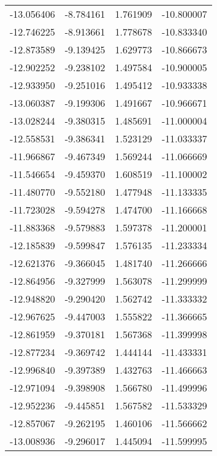 \begin{tabular}{rrrr}
      -13.056406 &        -8.784161 &    1.761909 & -10.800007 \\
      -12.746225 &        -8.913661 &    1.778678 & -10.833340 \\
      -12.873589 &        -9.139425 &    1.629773 & -10.866673 \\
      -12.902252 &        -9.238102 &    1.497584 & -10.900005 \\
      -12.933950 &        -9.251016 &    1.495412 & -10.933338 \\
      -13.060387 &        -9.199306 &    1.491667 & -10.966671 \\
      -13.028244 &        -9.380315 &    1.485691 & -11.000004 \\
      -12.558531 &        -9.386341 &    1.523129 & -11.033337 \\
      -11.966867 &        -9.467349 &    1.569244 & -11.066669 \\
      -11.546654 &        -9.459370 &    1.608519 & -11.100002 \\
      -11.480770 &        -9.552180 &    1.477948 & -11.133335 \\
      -11.723028 &        -9.594278 &    1.474700 & -11.166668 \\
      -11.883368 &        -9.579883 &    1.597378 & -11.200001 \\
      -12.185839 &        -9.599847 &    1.576135 & -11.233334 \\
      -12.621376 &        -9.366045 &    1.481740 & -11.266666 \\
      -12.864956 &        -9.327999 &    1.563078 & -11.299999 \\
      -12.948820 &        -9.290420 &    1.562742 & -11.333332 \\
      -12.967625 &        -9.447003 &    1.555822 & -11.366665 \\
      -12.861959 &        -9.370181 &    1.567368 & -11.399998 \\
      -12.877234 &        -9.369742 &    1.444144 & -11.433331 \\
      -12.996840 &        -9.397389 &    1.432763 & -11.466663 \\
      -12.971094 &        -9.398908 &    1.566780 & -11.499996 \\
      -12.952236 &        -9.445851 &    1.567582 & -11.533329 \\
      -12.857067 &        -9.262195 &    1.460106 & -11.566662 \\
      -13.008936 &        -9.296017 &    1.445094 & -11.599995 \\

\end{tabular}
